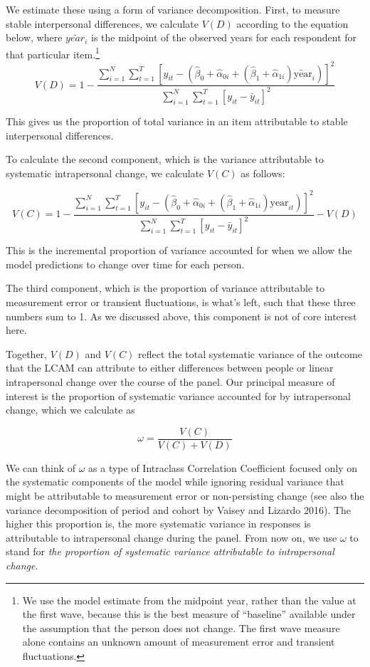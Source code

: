 \documentclass[
  12pt,
]{article}
\begin{document}
We estimate these using a form of variance decomposition. First, to
measure stable interpersonal differences, we calculate \(V(D)\)
according to the equation below, where \(\widetilde{year_i}\) is the
midpoint of the observed years for each respondent for that particular
item.\footnote{We use the model estimate from the midpoint year, rather
  than the value at the first wave, because this is the best measure of
  ``baseline'' available under the assumption that the person does not
  change. The first wave measure alone contains an unknown amount of
  measurement error and transient fluctuations.} \[
V(D) = 1 - \frac{\sum_{i=1}^N \sum_{t=1}^T [y_{it} - (\hat{\beta}_0 + \hat{\alpha}_{0i} + (\hat{\beta}_1 + \hat{\alpha}_{1i}) \widetilde{\text{year}}_{i})]^2}{\sum_{i=1}^N \sum_{t=1}^T [y_{it} - \bar{y}_{it}]^2}
\]

This gives us the proportion of total variance in an item attributable
to stable interpersonal differences.

To calculate the second component, which is the variance attributable to
systematic intrapersonal change, we calculate \(V(C)\) as follows:

\[
V(C) = 1 - \frac{\sum_{i=1}^N \sum_{t=1}^T [y_{it} - (\hat{\beta}_0 + \hat{\alpha}_{0i} + (\hat{\beta}_1 + \hat{\alpha}_{1i}) \text{year}_{it})]^2}{\sum_{i=1}^N \sum_{t=1}^T [y_{it} - \bar{y}_{it}]^2} - V(D)
\]

This is the incremental proportion of variance accounted for when we
allow the model predictions to change over time for each person.

The third component, which is the proportion of variance attributable to
measurement error or transient fluctuations, is what's left, such that
these three numbers sum to 1. As we discussed above, this component is
not of core interest here.

Together, \(V(D)\) and \(V(C)\) reflect the total systematic variance of
the outcome that the LCAM can attribute to either differences between
people or linear intrapersonal change over the course of the panel. Our
principal measure of interest is the proportion of systematic variance
accounted for by intrapersonal change, which we calculate as

\[
\omega = \frac{V(C)}{V(C) + V(D)}
\]

We can think of \(\omega\) as a type of Intraclass Correlation
Coefficient focused only on the systematic components of the model while
ignoring residual variance that might be attributable to measurement
error or non-persisting change (see also the variance decomposition of
period and cohort by Vaisey and Lizardo 2016). The higher this
proportion is, the more systematic variance in responses is attributable
to intrapersonal change during the panel. From now on, we use \(\omega\)
to stand for \emph{the proportion of systematic variance attributable to
intrapersonal change}.
\end{document}
